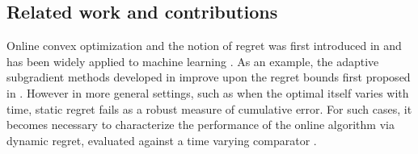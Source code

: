 \documentclass[draftcls,onecolumn,12pt]{IEEEtran}
\theoremstyle{plain}
\theoremstyle{plain}
\theoremstyle{remark}
\begin{document}
	
	
	\subsection{Related work and contributions}
Online convex optimization and the notion of regret was first introduced in \cite{zinkevich2003online} and has been widely applied to machine learning \cite{zinkevich2003online,xiao2014proximal,Duchi2011}. As an example, the adaptive subgradient methods developed in \cite{Duchi2011} improve upon the regret bounds first proposed in \cite{zinkevich2003online}. However in  more general settings, such as when the optimal itself varies with time, static regret fails as a robust measure of cumulative error. For such cases, it becomes necessary to characterize the performance of the online algorithm via dynamic regret, evaluated against a time varying comparator \cite{besbes2015non, bedi2018tracking}. 
\end{document}
